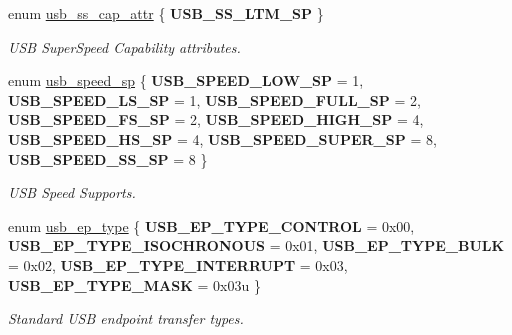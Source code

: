 \begin{DoxyCompactItemize}
enum \hyperlink{group__usb__protocol__group_ga83fdfa2cd4ff3a5ea7c8d6806f3d5685}{usb\+\_\+ss\+\_\+cap\+\_\+attr} \{ {\bfseries U\+S\+B\+\_\+\+S\+S\+\_\+\+L\+T\+M\+\_\+\+SP}
 \}\begin{DoxyCompactList}\small\item\em U\+SB Super\+Speed Capability attributes. \end{DoxyCompactList}
\item 
\mbox{\label{group__usb__protocol__group_gaaa900ea6ec7302fde55332e3b24bf3b6}} 
enum \hyperlink{group__usb__protocol__group_gaaa900ea6ec7302fde55332e3b24bf3b6}{usb\+\_\+speed\+\_\+sp} \{ \newline
{\bfseries U\+S\+B\+\_\+\+S\+P\+E\+E\+D\+\_\+\+L\+O\+W\+\_\+\+SP} = 1, 
{\bfseries U\+S\+B\+\_\+\+S\+P\+E\+E\+D\+\_\+\+L\+S\+\_\+\+SP} = 1, 
{\bfseries U\+S\+B\+\_\+\+S\+P\+E\+E\+D\+\_\+\+F\+U\+L\+L\+\_\+\+SP} = 2, 
{\bfseries U\+S\+B\+\_\+\+S\+P\+E\+E\+D\+\_\+\+F\+S\+\_\+\+SP} = 2, 
\newline
{\bfseries U\+S\+B\+\_\+\+S\+P\+E\+E\+D\+\_\+\+H\+I\+G\+H\+\_\+\+SP} = 4, 
{\bfseries U\+S\+B\+\_\+\+S\+P\+E\+E\+D\+\_\+\+H\+S\+\_\+\+SP} = 4, 
{\bfseries U\+S\+B\+\_\+\+S\+P\+E\+E\+D\+\_\+\+S\+U\+P\+E\+R\+\_\+\+SP} = 8, 
{\bfseries U\+S\+B\+\_\+\+S\+P\+E\+E\+D\+\_\+\+S\+S\+\_\+\+SP} = 8
 \}\begin{DoxyCompactList}\small\item\em U\+SB Speed Supports. \end{DoxyCompactList}
\item 
\mbox{\label{group__usb__protocol__group_ga666def795a15032e5bf93a450f79113f}} 
enum \hyperlink{group__usb__protocol__group_ga666def795a15032e5bf93a450f79113f}{usb\+\_\+ep\+\_\+type} \{ \newline
{\bfseries U\+S\+B\+\_\+\+E\+P\+\_\+\+T\+Y\+P\+E\+\_\+\+C\+O\+N\+T\+R\+OL} = 0x00, 
{\bfseries U\+S\+B\+\_\+\+E\+P\+\_\+\+T\+Y\+P\+E\+\_\+\+I\+S\+O\+C\+H\+R\+O\+N\+O\+US} = 0x01, 
{\bfseries U\+S\+B\+\_\+\+E\+P\+\_\+\+T\+Y\+P\+E\+\_\+\+B\+U\+LK} = 0x02, 
{\bfseries U\+S\+B\+\_\+\+E\+P\+\_\+\+T\+Y\+P\+E\+\_\+\+I\+N\+T\+E\+R\+R\+U\+PT} = 0x03, 
\newline
{\bfseries U\+S\+B\+\_\+\+E\+P\+\_\+\+T\+Y\+P\+E\+\_\+\+M\+A\+SK} = 0x03u
 \}\begin{DoxyCompactList}\small\item\em Standard U\+SB endpoint transfer types. \end{DoxyCompactList}

\end{DoxyCompactItemize}
